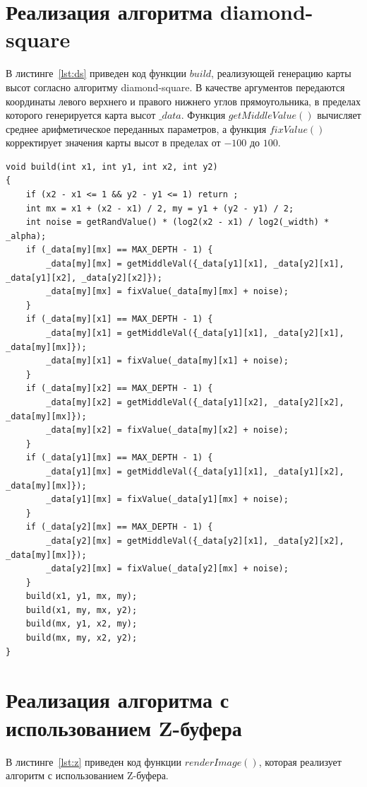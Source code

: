\documentclass[a4paper, 14pt]{extreport}
\begin{document}
\section{Реализация алгоритма diamond-square}

В листинге~\ref{lst:ds} приведен код функции $build$, реализующей генерацию карты высот согласно алгоритму diamond-square. 
В качестве аргументов передаются координаты левого верхнего и правого нижнего углов прямоугольника, в пределах которого 
генерируется карта высот $\_data$. Функция $getMiddleValue()$ вычисляет среднее арифметическое переданных параметров, а 
функция $fixValue()$ корректирует значения карты высот в пределах от $-100$ до $100$. 
\begin{lstlisting}[style=lang, label=lst:ds,caption=Реализация функции build]
void build(int x1, int y1, int x2, int y2)
{
    if (x2 - x1 <= 1 && y2 - y1 <= 1) return ;
    int mx = x1 + (x2 - x1) / 2, my = y1 + (y2 - y1) / 2;
    int noise = getRandValue() * (log2(x2 - x1) / log2(_width) * _alpha);
    if (_data[my][mx] == MAX_DEPTH - 1) {
        _data[my][mx] = getMiddleVal({_data[y1][x1], _data[y2][x1], _data[y1][x2], _data[y2][x2]});
        _data[my][mx] = fixValue(_data[my][mx] + noise);
    }
    if (_data[my][x1] == MAX_DEPTH - 1) {
        _data[my][x1] = getMiddleVal({_data[y1][x1], _data[y2][x1], _data[my][mx]});
        _data[my][x1] = fixValue(_data[my][x1] + noise);
    }
    if (_data[my][x2] == MAX_DEPTH - 1) {
        _data[my][x2] = getMiddleVal({_data[y1][x2], _data[y2][x2], _data[my][mx]});
        _data[my][x2] = fixValue(_data[my][x2] + noise);
    }
    if (_data[y1][mx] == MAX_DEPTH - 1) {
        _data[y1][mx] = getMiddleVal({_data[y1][x1], _data[y1][x2], _data[my][mx]});
        _data[y1][mx] = fixValue(_data[y1][mx] + noise);
    }
    if (_data[y2][mx] == MAX_DEPTH - 1) {
        _data[y2][mx] = getMiddleVal({_data[y2][x1], _data[y2][x2], _data[my][mx]});
        _data[y2][mx] = fixValue(_data[y2][mx] + noise);
    }
    build(x1, y1, mx, my);
    build(x1, my, mx, y2);
    build(mx, y1, x2, my);
    build(mx, my, x2, y2);
}
\end{lstlisting}

\section{Реализация алгоритма с использованием Z-буфера}

В листинге~\ref{lst:z} приведен код функции $renderImage()$, которая реализует алгоритм с использованием Z-буфера.
\end{document}
